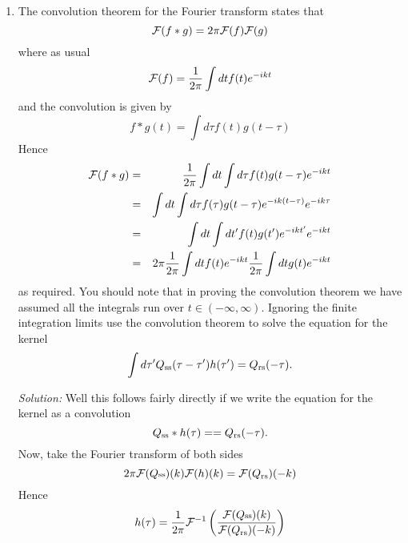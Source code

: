 \documentclass[12pt]{article}
\newcommand\soln{\noindent\textit{Solution:} }
\begin{document}
\begin{enumerate}
\item The convolution theorem for the Fourier transform states that
\begin{equation}
{\cal F}(f*g)=2\pi{\cal F}(f){\cal F}(g)
\end{equation}
where as usual
\begin{equation}
{\cal F}(f)=\frac{1}{2\pi}\int dt f(t)e^{-ikt}
\end{equation}
and the convolution is given by
\begin{equation}
f*g(t)=\int d\tau f(t)g(t-\tau)
\end{equation}
Hence 
\begin{eqnarray}
{\cal F}(f*g)&=&\frac{1}{2\pi}\int dt \int d\tau f(t)g(t-\tau) e^{-ikt}\cr
             &=&\int dt \int d\tau f(\tau)g(t-\tau) e^{-ik(t-\tau)}e^{-ik\tau}\cr
             &=&\int dt \int dt' f(t)g(t') e^{-ikt'}e^{-ikt}\cr
             &=&2\pi \frac{1}{2\pi}\int dt f(t)e^{-ikt}\frac{1}{2\pi}\int dt g(t)e^{-ikt}
\end{eqnarray}
as required. You should note that in proving the convolution theorem
we have assumed all the integrals run over $t\in
(-\infty,\infty)$. Ignoring the finite integration limits use the
convolution theorem to solve the equation for the kernel
\begin{equation}
\int {d\tau' Q_{\mbox{\scriptsize{ss}}}(\tau-\tau')h(\tau')}=Q_{\mbox{\scriptsize{rs}}}(-\tau).
\end{equation}

\soln Well this follows fairly directly if we write the equation for the kernel as a convolution
\begin{equation}
Q_{\mbox{\scriptsize{ss}}}*h(\tau)==Q_{\mbox{\scriptsize{rs}}}(-\tau).
\end{equation}
Now, take the Fourier transform of both sides
\begin{equation}
2\pi{\cal F}(Q{\mbox{\scriptsize{ss}}})(k){\cal F}(h)(k)={\cal F}(Q_{\mbox{\scriptsize{rs}}})(-k)
\end{equation}
Hence
\begin{equation}
h(\tau)=\frac{1}{2\pi}{\cal F}^{-1}\left(\frac{{\cal F}(Q{\mbox{\scriptsize{ss}}})(k)}{{\cal F}(Q_{\mbox{\scriptsize{rs}}})(-k)}\right)
\end{equation}


\end{enumerate}
\end{document}
